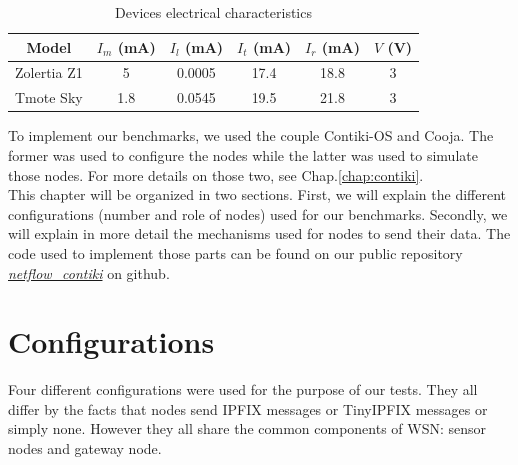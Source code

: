 \begin{table}
  \centering

  \begin{tabular}{|c|c|c|c|c|c|}
    \hline
    Model & $I_m$ (mA) & $I_l$ (mA) & $I_t$ (mA) & $I_r$ (mA) & $V$ (V)\\
    \hline
    Zolertia Z1 & 5 & 0.0005 & 17.4 & 18.8 & 3 \\
    \hline
    Tmote Sky & 1.8 & 0.0545 & 19.5 & 21.8 & 3 \\
    \hline
  \end{tabular}
  \caption{Devices electrical characteristics}
  \label{table:device_consumption}
\end{table}

To implement our benchmarks, we used the couple Contiki-OS and Cooja. The former was used to configure the nodes while the latter was used to simulate those nodes. For more details on those two, see Chap.\ref{chap:contiki}.\\

This chapter will be organized in two sections. First, we will explain the different configurations (number and role of nodes) used for our benchmarks. Secondly, we will explain in more detail the mechanisms used for nodes to send their data. The code used to implement those parts can be found on our public repository \textit{\href{https://github.com/edd19/netflow_contiki}{netflow\_contiki}} on github.

\section{Configurations}
Four different configurations were used for the purpose of our tests. They all differ by the facts that nodes send IPFIX messages or TinyIPFIX messages  or simply none. However they all share the common components of WSN: sensor nodes and gateway node.

